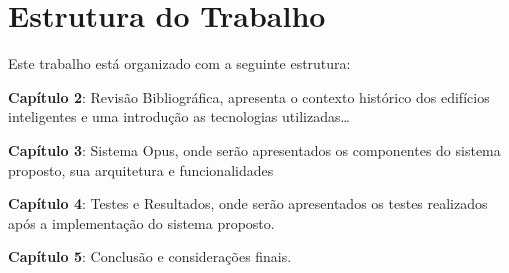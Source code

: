 \section{Estrutura do Trabalho}
Este trabalho está organizado com a seguinte estrutura:

\textbf{Capítulo 2}: Revisão Bibliográfica, apresenta o contexto histórico dos edifícios inteligentes e uma introdução 
as tecnologias utilizadas\dots

\textbf{Capítulo 3}: Sistema Opus, onde serão apresentados os componentes
do sistema proposto, sua arquitetura e funcionalidades

\textbf{Capítulo 4}: Testes e Resultados, onde serão apresentados os testes realizados após a
implementação do sistema proposto.

\textbf{Capítulo 5}: Conclusão e considerações finais.
